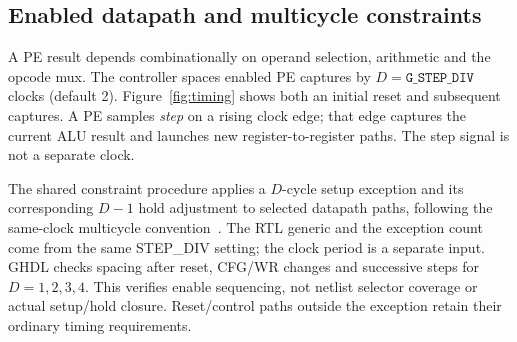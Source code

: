 \subsection{Enabled datapath and multicycle constraints}
\label{sec:mcp}

A PE result depends combinationally on operand selection, arithmetic and the
opcode mux. The controller spaces enabled PE captures by
$D=\texttt{G\_STEP\_DIV}$ clocks (default 2). Figure~\ref{fig:timing} shows
both an initial reset and subsequent captures. A PE samples \emph{step} on a
rising clock edge; that edge captures the current ALU result and launches
new register-to-register paths. The step signal is not a separate clock.



The shared constraint procedure applies a $D$-cycle setup exception and its
corresponding $D-1$ hold adjustment to selected datapath paths, following the
same-clock multicycle convention~\cite{ug903,bhasker-timing}. The RTL generic
and the exception count come from the same STEP\_DIV setting; the clock period
is a separate input. GHDL checks spacing after reset, CFG/WR changes and
successive steps for $D=1,2,3,4$. This verifies enable sequencing, not netlist
selector coverage or actual setup/hold closure. Reset/control paths outside
the exception retain their ordinary timing requirements.
